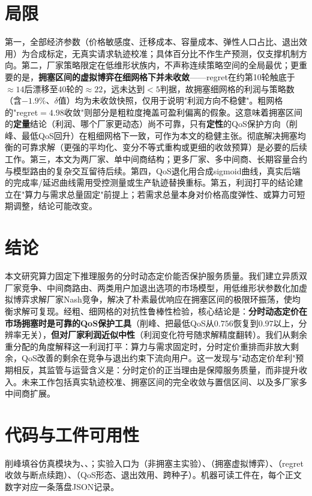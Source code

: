 \documentclass[UTF8,11pt]{ctexart}
\begin{document}
\section{局限}
\label{sec:limitations}

第一，全部经济参数（价格敏感度、迁移成本、容量成本、弹性人口占比、退出效用）为合成标定，无真实请求轨迹校准；具体百分比不作生产预测，仅支撑机制方向。第二，厂家策略限定在低维形状族内，不声称连续策略空间的全局最优；更重要的是，\textbf{拥塞区间的虚拟博弈在细网格下并未收敛}——regret在约第10轮触底于$\approx14$后漂移至40轮的$\approx22$，远未达到$<5$判据，故拥塞细网格的利润与策略数（含$-1.9\%$、$\delta$值）均为未收敛快照，仅用于说明"利润方向不稳健"。粗网格的"regret$=4.98$收敛"则部分是粗粒度掩盖可盈利偏离的假象。这意味着拥塞区间的\textbf{定量}结论（利润、哪个厂家更动态）尚不可靠，只有\textbf{定性}的QoS保护方向（削峰、最低QoS回升）在粗细网格下一致，可作为本文的稳健主张。彻底解决拥塞均衡的可靠求解（更强的平均化、变分不等式重构或更细的收敛预算）是必要的后续工作。第三，本文为两厂家、单中间商结构；更多厂家、多中间商、长期容量合约与模型路由的复杂交互留待后续。第四，QoS退化用合成sigmoid曲线，真实后端的完成率/延迟曲线需用受控测量或生产轨迹替换重标。第五，利润打平的结论建立在"算力与需求总量固定"前提上；若需求总量本身对价格高度弹性、或算力可短期调整，结论可能改变。

\section{结论}
\label{sec:conclusion}

本文研究算力固定下推理服务的分时动态定价能否保护服务质量。我们建立异质双厂家竞争、中间商路由、两类用户加退出选项的市场模型，用低维形状参数化加虚拟博弈求解厂家Nash竞争，解决了朴素最优响应在拥塞区间的极限环振荡，使均衡求解可复现。经粗、细网格的对抗性鲁棒性检验，核心结论是：\textbf{分时动态定价在市场拥塞时是可靠的QoS保护工具}（削峰、把最低QoS从$0.756$恢复到$0.97$以上，分辨率无关），\textbf{但对厂家利润近似中性}（利润变化符号随求解精度翻转）。我们从剩余重分配的角度解释这一利润打平：算力与需求固定时，分时定价重排而非放大剩余，QoS改善的剩余在竞争与退出约束下流向用户。这一发现与"动态定价牟利"预期相反，其监管与运营含义是：分时定价的正当理由是保障服务质量，而非提升收入。未来工作包括真实轨迹校准、拥塞区间的完全收敛与置信区间、以及多厂家多中间商扩展。

\section*{代码与工件可用性}
削峰填谷仿真模块为、、；实验入口为（非拥塞主实验）、（拥塞虚拟博弈）、（regret收敛与断点续跑）、（QoS形态、退出效用、跨种子）。机器可读工件在，每个正文数字对应一条落盘JSON记录。

\small


\end{document}
